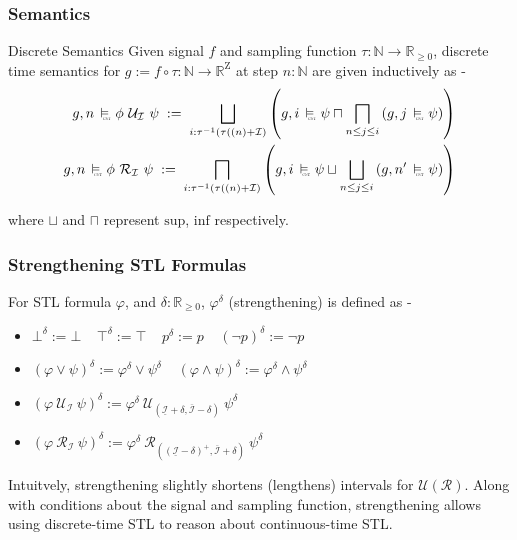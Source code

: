 \documentclass{beamer}
\newcommand{\typeTime}{\mathbb{R}_{\geq 0}}
\newcommand{\typeReal}{\mathbb{R}}
\newcommand{\typeNat}{\mathbb{N}}
\newcommand{\until}{\mathcal{U}}
\newcommand{\release}{\mathcal{R}}
\newcommand{\interval}{\mathcal{I}}
\newcommand{\Z}{\text{Z}}
\newcommand{\cont}{\raisebox{-0.1ex}{\scalebox{0.25}{\textrm{CNT}}}}
\newcommand{\contSatisfy}{\ \stackMath\stackunder[0pt]{\vDash}{\hspace*{0.3em}\cont}\ }
\newcommand{\robustAssign}{\; := \;}
\begin{document}
\begin{frame}
    \frametitle{Semantics}
    \begin{block}{Discrete Semantics}
        Given signal $f$ and sampling function $\tau : \typeNat
        \to \typeTime$, discrete time semantics for $g := f \circ \tau : \typeNat
        \to  \typeReal^{\Z}$ at step $n:\typeNat$ are given inductively as -
        \begin{align*}
            g, n \contSatisfy \phi\ \until_{\interval}\ \psi
            \robustAssign \bigsqcup_{i: \tau^{-1}(\tau((n) +\interval)}\left( g, i \contSatisfy \psi
           \sqcap \bigsqcap_{n \leq j \leq i} \left( g, j \contSatisfy \psi
            \right ) \right) \\
            g, n \contSatisfy \phi\ \release_{\interval}\ \psi
           \robustAssign \bigsqcap_{i: \tau^{-1}(\tau((n) +\interval)} \left( g, i \contSatisfy \psi
           \sqcup \bigsqcup_{n \leq j \leq i} \left( g, n' \contSatisfy \psi
            \right ) \right)
        \end{align*}
    \end{block}
    where $\sqcup$ and $\sqcap$ represent $\text{sup}$, $\text{inf}$ respectively.
\end{frame}

\begin{frame}
    \frametitle{Strengthening STL Formulas}
    For STL formula $\varphi$, and $\delta : \typeTime$,
    $\varphi^{\delta}$ (strengthening) is defined as -
    \begin{itemize}
        \item $\bot^{\delta} := \bot \;\;\;\; \top^{\delta} := \top   \;\;\;\; p^{\delta} := p
            \;\;\;\; (\neg p)^{\delta} := \neg p$
        \item $(\varphi \vee \psi)^{\delta} := \varphi^{\delta} \vee \psi^{\delta}
            \;\;\;\; (\varphi \wedge \psi)^{\delta} := \varphi^{\delta} \wedge \psi^{\delta}$
        \item $(\varphi\ \until_{\interval}\ \psi)^{\delta} := \varphi^{\delta} \
            \until_{\left (\underline{\interval} + \delta, \overline{\interval}
            - \delta \right)}\ \psi^{\delta}$
        \item $(\varphi\ \release_{\interval}\ \psi)^{\delta} := \varphi^{\delta} \
            \release_{\left ((\underline{\interval} - \delta)^{+}, \overline{\interval}
            + \delta \right)}\ \psi^{\delta}$
    \end{itemize}
    Intuitvely, strengthening slightly shortens (lengthens) intervals
    for $\until (\release) $. Along with conditions about the signal
    and sampling function, strengthening allows using discrete-time
    STL to reason about continuous-time STL.
\end{frame}
\end{document}
